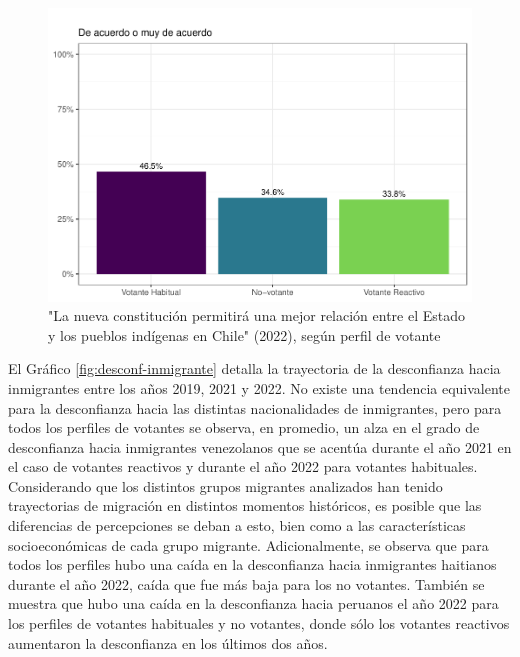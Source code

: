 \documentclass[
  12pt,
]{book}
\begin{document}
\begin{figure}

{\centering \includegraphics{reporte-elsoc_files/figure-latex/consti-mapuche-1} 

}

\caption{"La nueva constitución permitirá una mejor relación entre el Estado y los pueblos indígenas en Chile" (2022), según perfil de votante}\label{fig:consti-mapuche}
\end{figure}

El Gráfico \ref{fig:desconf-inmigrante} detalla la trayectoria de la desconfianza hacia inmigrantes entre los años 2019, 2021 y 2022. No existe una tendencia equivalente para la desconfianza hacia las distintas nacionalidades de inmigrantes, pero para todos los perfiles de votantes se observa, en promedio, un alza en el grado de desconfianza hacia inmigrantes venezolanos que se acentúa durante el año 2021 en el caso de votantes reactivos y durante el año 2022 para votantes habituales. Considerando que los distintos grupos migrantes analizados han tenido trayectorias de migración en distintos momentos históricos, es posible que las diferencias de percepciones se deban a esto, bien como a las características socioeconómicas de cada grupo migrante. Adicionalmente, se observa que para todos los perfiles hubo una caída en la desconfianza hacia inmigrantes haitianos durante el año 2022, caída que fue más baja para los no votantes. También se muestra que hubo una caída en la desconfianza hacia peruanos el año 2022 para los perfiles de votantes habituales y no votantes, donde sólo los votantes reactivos aumentaron la desconfianza en los últimos dos años.
\end{document}
